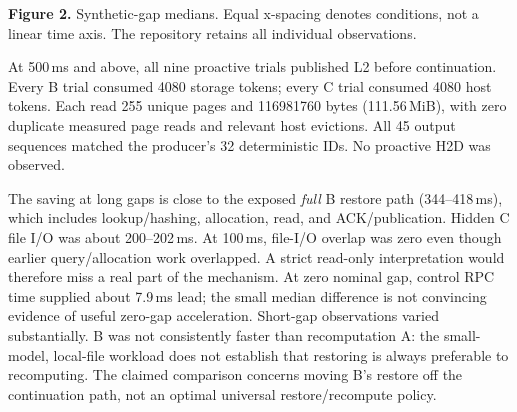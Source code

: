 \documentclass[10pt,a4paper]{article}
\begin{document}
\begin{center}
\end{center}
{\small\textbf{Figure 2.} Synthetic-gap medians. Equal x-spacing denotes conditions, not a linear time axis. The repository retains all individual observations.}

At 500\,ms and above, all nine proactive trials published L2 before continuation. Every B trial consumed 4080 storage tokens; every C trial consumed 4080 host tokens. Each read 255 unique pages and 116981760 bytes (111.56\,MiB), with zero duplicate measured page reads and relevant host evictions. All 45 output sequences matched the producer's 32 deterministic IDs. No proactive H2D was observed.

The saving at long gaps is close to the exposed \emph{full} B restore path (344--418\,ms), which includes lookup/hashing, allocation, read, and ACK/publication. Hidden C file I/O was about 200--202\,ms. At 100\,ms, file-I/O overlap was zero even though earlier query/allocation work overlapped. A strict read-only interpretation would therefore miss a real part of the mechanism. At zero nominal gap, control RPC time supplied about 7.9\,ms lead; the small median difference is not convincing evidence of useful zero-gap acceleration. Short-gap observations varied substantially. B was not consistently faster than recomputation A: the small-model, local-file workload does not establish that restoring is always preferable to recomputing. The claimed comparison concerns moving B's restore off the continuation path, not an optimal universal restore/recompute policy.
\end{document}
